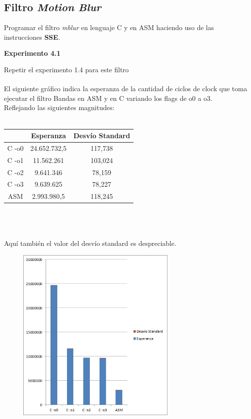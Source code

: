 
\subsection{Filtro \textit{Motion Blur}}
Programar el filtro \textit{mblur} en lenguaje C y en ASM haciendo uso de 
las instrucciones \textbf{SSE}.

\vspace*{0.3cm} \noindent
\textbf{Experimento 4.1}

Repetir el experimento 1.4 para este filtro \\
\\
El siguiente gr\'afico indica la esperanza de la cantidad de ciclos de clock que toma ejecutar el filtro Bandas en ASM y en C variando los flags de o0 a o3. \\
Reflejando las siguientes magnitudes: \\
\\
 \begin{tabular}[c]{|c|c|c|}
	\hline
		 & Esperanza & Desv\'io Standard\\
		\hline
C -o0 & 24.652.732,5 & 117,738 \\
\hline
C -o1 & 11.562.261 & 103,024  \\
\hline
C -o2 & 9.641.346 & 78,159  \\
\hline
C -o3 & 9.639.625 & 78,227 \\
\hline
ASM & 2.993.980,5 & 118,245 \\
\hline
	\end{tabular}\\\\
\\
Aqu\'i tambi\'en el valor del desv\'io standard es despreciable. \\
\newpage
\begin{figure}
  \begin{center}
	\includegraphics[width=0.7\textwidth]{imagenes/41.jpg}
  \end{center}
\end{figure}
\newpage